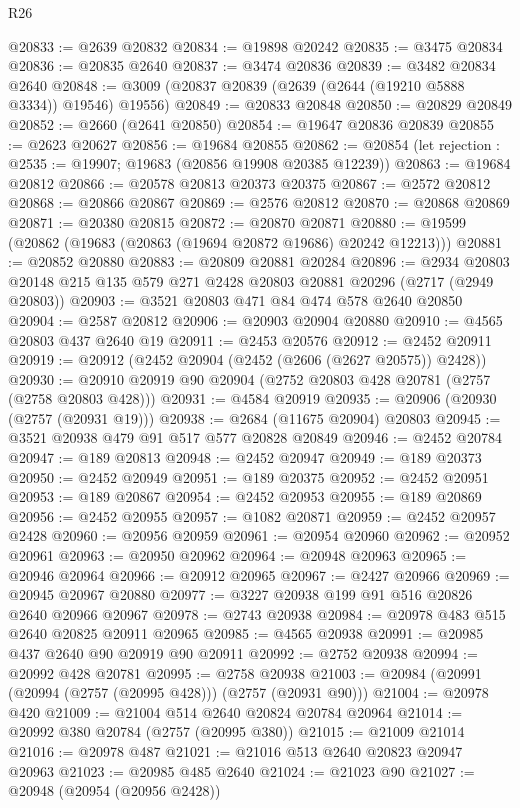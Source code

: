 \begin{lexlean}{R26}
\begin{coremodule}
@20833 := @2639 @20832
@20834 := @19898 @20242
@20835 := @3475 @20834
@20836 := @20835 @2640
@20837 := @3474 @20836
@20839 := @3482 @20834 @2640
@20848 := @3009 (@20837 @20839 (@2639 (@2644 (@19210 @5888 @3334)) @19546) @19556)
@20849 := @20833 @20848
@20850 := @20829 @20849
@20852 := @2660 (@2641 @20850)
@20854 := @19647 @20836 @20839
@20855 := @2623 @20627
@20856 := @19684 @20855
@20862 := @20854 (let rejection : @2535 := @19907; @19683 (@20856 @19908 @20385 @12239))
@20863 := @19684 @20812
@20866 := @20578 @20813 @20373 @20375
@20867 := @2572 @20812
@20868 := @20866 @20867
@20869 := @2576 @20812
@20870 := @20868 @20869
@20871 := @20380 @20815
@20872 := @20870 @20871
@20880 := @19599 (@20862 (@19683 (@20863 (@19694 @20872 @19686) @20242 @12213)))
@20881 := @20852 @20880
@20883 := @20809 @20881 @20284
@20896 := @2934 @20803 @20148 @215 @135 @579 @271 @2428 @20803 @20881 @20296 (@2717 (@2949 @20803))
@20903 := @3521 @20803 @471 @84 @474 @578 @2640 @20850
@20904 := @2587 @20812
@20906 := @20903 @20904 @20880
@20910 := @4565 @20803 @437 @2640 @19
@20911 := @2453 @20576
@20912 := @2452 @20911
@20919 := @20912 (@2452 @20904 (@2452 (@2606 (@2627 @20575)) @2428))
@20930 := @20910 @20919 @90 @20904 (@2752 @20803 @428 @20781 (@2757 (@2758 @20803 @428)))
@20931 := @4584 @20919
@20935 := @20906 (@20930 (@2757 (@20931 @19)))
@20938 := @2684 (@11675 @20904) @20803
@20945 := @3521 @20938 @479 @91 @517 @577 @20828 @20849
@20946 := @2452 @20784
@20947 := @189 @20813
@20948 := @2452 @20947
@20949 := @189 @20373
@20950 := @2452 @20949
@20951 := @189 @20375
@20952 := @2452 @20951
@20953 := @189 @20867
@20954 := @2452 @20953
@20955 := @189 @20869
@20956 := @2452 @20955
@20957 := @1082 @20871
@20959 := @2452 @20957 @2428
@20960 := @20956 @20959
@20961 := @20954 @20960
@20962 := @20952 @20961
@20963 := @20950 @20962
@20964 := @20948 @20963
@20965 := @20946 @20964
@20966 := @20912 @20965
@20967 := @2427 @20966
@20969 := @20945 @20967 @20880
@20977 := @3227 @20938 @199 @91 @516 @20826 @2640 @20966 @20967
@20978 := @2743 @20938
@20984 := @20978 @483 @515 @2640 @20825 @20911 @20965
@20985 := @4565 @20938
@20991 := @20985 @437 @2640 @90 @20919 @90 @20911
@20992 := @2752 @20938
@20994 := @20992 @428 @20781
@20995 := @2758 @20938
@21003 := @20984 (@20991 (@20994 (@2757 (@20995 @428))) (@2757 (@20931 @90)))
@21004 := @20978 @420
@21009 := @21004 @514 @2640 @20824 @20784 @20964
@21014 := @20992 @380 @20784 (@2757 (@20995 @380))
@21015 := @21009 @21014
@21016 := @20978 @487
@21021 := @21016 @513 @2640 @20823 @20947 @20963
@21023 := @20985 @485 @2640
@21024 := @21023 @90
@21027 := @20948 (@20954 (@20956 @2428))

\end{coremodule}
\end{lexlean}
